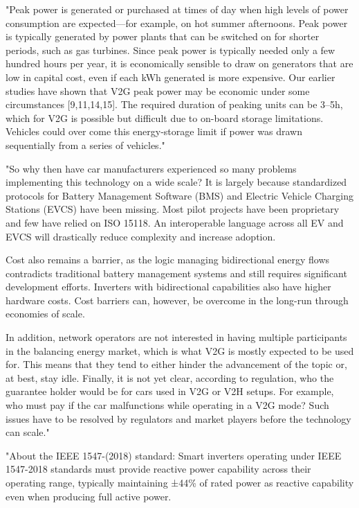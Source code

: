"Peak power is generated or purchased at times of day when high levels of power consumption are expected—for example, on hot summer afternoons. Peak power is typically generated by power plants that can be switched on for shorter periods, such as gas turbines. Since peak power is typically needed only a few hundred hours per year, it is economically sensible to draw on generators that are low in capital cost, even if each kWh generated is more expensive. Our earlier studies have shown that V2G peak power may be economic under some circumstances [9,11,14,15]. The required duration of peaking units can be 3–5h, which for V2G is possible but difficult due to on-board storage limitations. Vehicles could over come this energy-storage limit if power was drawn sequentially from a series of vehicles." \cite{kempton_vehicle--grid_2005}


"So why then have car manufacturers experienced so many problems implementing this technology on a wide scale? It is largely because standardized protocols for Battery Management Software (BMS) and Electric Vehicle Charging Stations (EVCS) have been missing. Most pilot projects have been proprietary and few have relied on ISO 15118. An interoperable language across all EV and EVCS will drastically reduce complexity and increase adoption. 

Cost also remains a barrier, as the logic managing bidirectional energy flows contradicts traditional battery management systems and still requires significant development efforts. Inverters with bidirectional capabilities also have higher hardware costs. Cost barriers can, however, be overcome in the long-run through economies of scale.

In addition, network operators are not interested in having multiple participants in the balancing energy market, which is what V2G is mostly expected to be used for. This means that they tend to either hinder the advancement of the topic or, at best, stay idle. Finally, it is not yet clear, according to regulation, who the guarantee holder would be for cars used in V2G or V2H setups. For example, who must pay if the car malfunctions while operating in a V2G mode? Such issues have to be resolved by regulators and market players before the technology can scale." 


"About the IEEE 1547-(2018) standard: Smart inverters operating under IEEE 1547-2018 standards must provide reactive power capability across their operating range, typically maintaining ±44\% of rated power as reactive capability even when producing full active power. 

